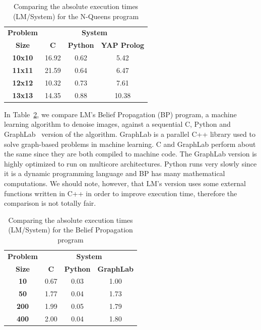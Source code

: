 \begin{table}[ht]
\centering
{\begin{tabular}{c|c|c|c}
\textbf{Problem} & \multicolumn{3}{c}{\textbf{System}} \\
\textbf{Size} & \textbf{C} & \textbf{Python} & \textbf{YAP Prolog} \\
\hline\hline
\textbf{10x10} & 16.92 & 0.62 & 5.42 \\
\textbf{11x11} & 21.59 & 0.64 & 6.47 \\
\textbf{12x12} & 10.32 & 0.73 & 7.61 \\
\textbf{13x13} & 14.35 & 0.88 & 10.38 \\
\end{tabular}}
\caption{Comparing the absolute execution times (LM/System) for the
  N-Queens program}
\label{tbl:comp_nqueens}
\end{table}

In Table~\ref{tbl:comp_bp}, we compare LM's Belief Propagation (BP)
program, a machine learning algorithm to denoise images, against a
sequential C, Python and GraphLab~\cite{GraphLab2010} version of the
algorithm. GraphLab is a parallel C++ library used to solve
graph-based problems in machine learning. C and GraphLab perform about
the same since they are both compiled to machine code. The GraphLab version
is highly optimized to run on multicore architectures.
Python runs very slowly since it is a
dynamic programming language and BP has many mathematical
computations. We should note, however, that LM's version uses some
external functions written in C++ in order to improve execution time,
therefore the comparison is not totally fair.

\begin{table}[ht]
\centering
{\begin{tabular}{c|c|c|c}
\textbf{Problem} & \multicolumn{3}{c}{\textbf{System}} \\
\textbf{Size} & \textbf{C} & \textbf{Python} & \textbf{GraphLab} \\
\hline\hline
\textbf{10}  & 0.67 & 0.03 & 1.00 \\
\textbf{50}  & 1.77 & 0.04 & 1.73 \\
\textbf{200} & 1.99 & 0.05 & 1.79 \\
\textbf{400} & 2.00 & 0.04 & 1.80 \\
\end{tabular}}
\caption{Comparing the absolute execution times (LM/System) for the
  Belief Propagation program}
\label{tbl:comp_bp}
\end{table}

